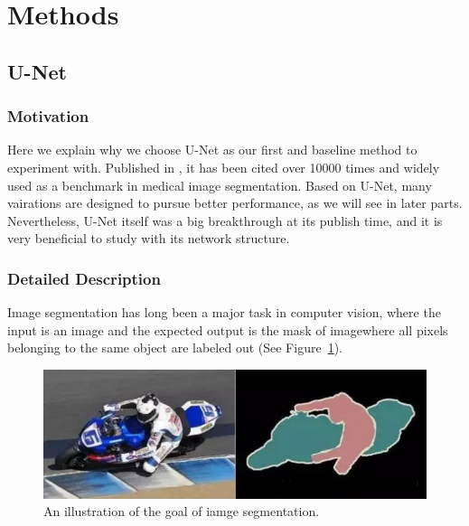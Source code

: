 \section{Methods}
\subsection{U-Net}
\subsubsection{Motivation}
Here we explain why we choose U-Net as our first and baseline method to experiment with. Published in \cite{unet}, it has been cited over 10000 times and widely used as a benchmark in medical image segmentation. Based on U-Net, many vairations are designed to pursue better performance, as we will see in later parts. Nevertheless, U-Net itself was a big breakthrough at its publish time, and it is very beneficial to study with its network structure.

\subsubsection{Detailed Description}
Image segmentation has long been a major task in computer vision, where the input is an image and the expected output is the mask of image\textemdash where all pixels belonging to the same object are labeled out (See Figure~\ref{fig:sege}). 
\begin{figure}[!htpb]
    \centering
    \includegraphics[scale=0.3]{figuras/segementation.jpg}
    \caption{An illustration of the goal of iamge segmentation.}
    \label{fig:sege}
\end{figure}

